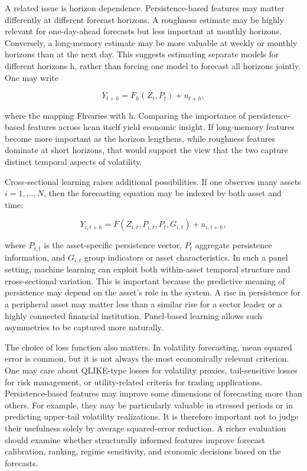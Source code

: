 \documentclass[12pt]{article}
\begin{document}
A related issue is horizon dependence. Persistence-based features may matter differently at different forecast horizons. A roughness estimate may be highly relevant for one-day-ahead forecasts but less important at monthly horizons. Conversely, a long-memory estimate may be more valuable at weekly or monthly horizons than at the next day. This suggests estimating separate models for different horizons h, rather than forcing one model to forecast all horizons jointly. One may write

\[Y_{t+h} = F_h(Z_t, P_t) + u_{t+h},\]

where the mapping Fhvaries with h. Comparing the importance of persistence-based features across hcan itself yield economic insight. If long-memory features become more important as the horizon lengthens, while roughness features dominate at short horizons, that would support the view that the two capture distinct temporal aspects of volatility.

Cross-sectional learning raises additional possibilities. If one observes many assets $i=1,\ldots,N$, then the forecasting equation may be indexed by both asset and time:

\[Y_{i,t+h} = F(Z_{i,t}, P_{i,t}, P_t, G_{i,t}) + u_{i,t+h},\]

where $P_{i,t}$ is the asset-specific persistence vector, $P_t$ aggregate persistence information, and $G_{i,t}$ group indicators or asset characteristics. In such a panel setting, machine learning can exploit both within-asset temporal structure and cross-sectional variation. This is important because the predictive meaning of persistence may depend on the asset's role in the system. A rise in persistence for a peripheral asset may matter less than a similar rise for a sector leader or a highly connected financial institution. Panel-based learning allows such asymmetries to be captured more naturally.

The choice of loss function also matters. In volatility forecasting, mean squared error is common, but it is not always the most economically relevant criterion. One may care about QLIKE-type losses for volatility proxies, tail-sensitive losses for risk management, or utility-related criteria for trading applications. Persistence-based features may improve some dimensions of forecasting more than others. For example, they may be particularly valuable in stressed periods or in predicting upper-tail volatility realizations. It is therefore important not to judge their usefulness solely by average squared-error reduction. A richer evaluation should examine whether structurally informed features improve forecast calibration, ranking, regime sensitivity, and economic decisions based on the forecasts.
\end{document}
